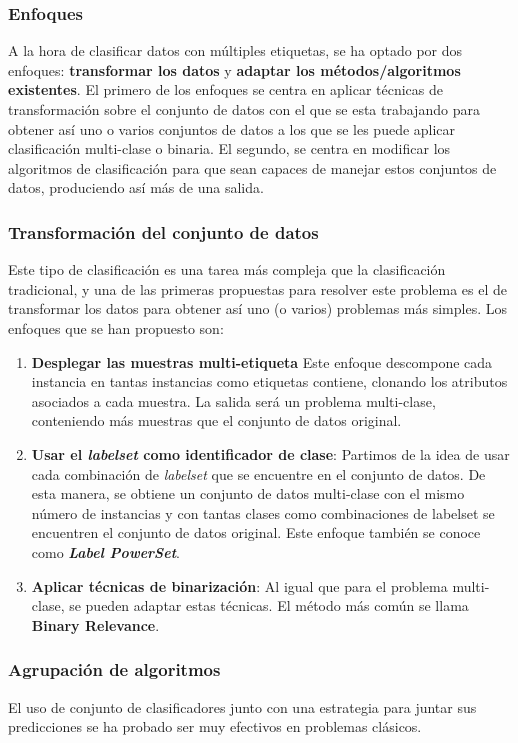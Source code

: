 \subsubsection*{Enfoques}
A la hora de clasificar datos con múltiples etiquetas, se ha optado por dos enfoques: \textbf{transformar los datos} y \textbf{adaptar los métodos/algoritmos existentes}. \linebreak
El primero de los enfoques se centra en aplicar técnicas de transformación sobre el conjunto de datos con el que se esta trabajando para obtener así uno o varios conjuntos de datos a los que se les puede aplicar clasificación multi-clase o binaria. \linebreak
El segundo, se centra en modificar los algoritmos de clasificación para que sean capaces de manejar estos conjuntos de datos, produciendo así más de una salida.
\subsubsection*{Transformación del conjunto de datos}
Este tipo de clasificación es una tarea más compleja que la clasificación tradicional, y una de las primeras propuestas para resolver este problema es el de transformar los datos para obtener así uno (o varios) problemas más simples.
Los enfoques que se han propuesto son:
\begin{enumerate}
	\item \textbf{Desplegar las muestras multi-etiqueta} Este enfoque descompone cada instancia en tantas instancias como etiquetas contiene, clonando los atributos asociados a cada muestra. La salida será un problema multi-clase, conteniendo más muestras que el conjunto de datos original.
	\item \textbf{Usar el \textit{labelset} como identificador de clase}: Partimos de la idea de usar cada combinación de \textit{labelset} que se encuentre en el conjunto de datos. De esta manera, se obtiene un conjunto de datos multi-clase con el mismo número de instancias y con tantas clases como combinaciones de labelset se encuentren el conjunto de datos original. Este enfoque también se conoce como \textbf{\textit{Label PowerSet}}.
	\item \textbf{Aplicar técnicas de binarización}: Al igual que para el problema multi-clase, se pueden adaptar estas técnicas. El método más común se llama \textbf{Binary Relevance}.
\end{enumerate}
\subsubsection*{Agrupación de algoritmos}
El uso de conjunto de clasificadores junto con una estrategia para juntar sus predicciones se ha probado ser muy efectivos en problemas clásicos.

